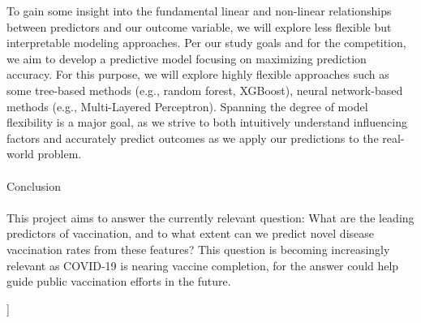 \documentclass{IEEEtran}
\begin{document}
\begin{@twocolumnfalse}
To gain some insight into the fundamental linear and non-linear relationships between predictors and our outcome variable, we will explore less flexible but interpretable modeling approaches. Per our study goals and for the competition, we aim to develop a predictive model focusing on maximizing prediction accuracy. For this purpose, we will explore highly flexible approaches such as some tree-based methods (e.g., random forest, XGBoost), neural network-based methods (e.g., Multi-Layered Perceptron). Spanning the degree of model flexibility is a major goal, as we strive to both intuitively understand influencing factors and accurately predict outcomes as we apply our predictions to the real-world problem.\\\\ 
{\huge Conclusion}\\\\
This project aims to answer the currently relevant question: What are the leading predictors of vaccination, and to what extent can we predict novel disease vaccination rates from these features? This question is becoming increasingly relevant as COVID-19 is nearing vaccine completion, for the answer could help guide public vaccination efforts in the future. 
\end{@twocolumnfalse}
]
\end{document}

